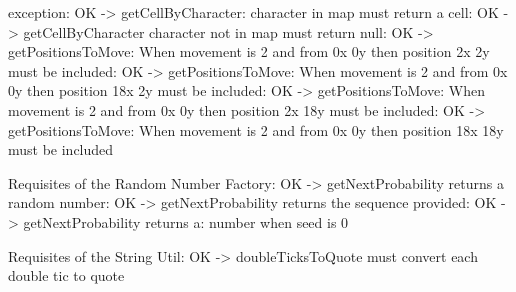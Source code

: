 \documentclass[a4paper]{article}
\begin{document}
exception: OK -{\textgreater} getCellByCharacter: character in map must return
a cell: OK -{\textgreater} getCellByCharacter character not in map must
return null: OK -{\textgreater} getPositionsToMove: When movement is 2 and from
0x 0y then position 2x 2y must be included: OK -{\textgreater} getPositionsToMove: When movement is 2 and from
0x 0y then position 18x 2y must be included: OK -{\textgreater} getPositionsToMove: When movement is 2 and from
0x 0y then position 2x 18y must be included: OK -{\textgreater} getPositionsToMove: When movement is 2 and from
0x 0y then position 18x 18y must be included

Requisites of the Random Number Factory: OK -{\textgreater} getNextProbability returns a random number: OK -{\textgreater} getNextProbability returns the sequence
provided: OK -{\textgreater} getNextProbability returns a: number when seed is
0

Requisites of the String Util: OK -{\textgreater} doubleTicksToQuote must convert each double tic to
quote
\end{document}
